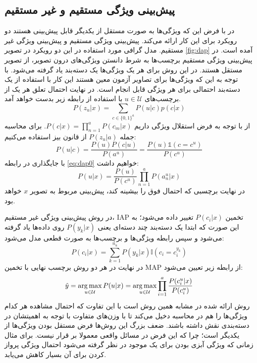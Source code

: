 \subsection{پیش‌بینی ویژگی مستقیم و غیر مستقیم}
در
\cite{lampert09}
با فرض این که ویژگی‌ها به صورت مستقل از یکدیگر قابل پیش‌بینی هستند دو رویکرد برای این کار ارائه می‌کند. پیش‌بینی ویژگی مستقیم
و پیش‌بینی ویژگی غیر مستقیم.
 مدل گرافی مورد استفاده در این دو رویکرد در تصویر \ref{fig:dap} آمده است. در پیش‌بینی ویژگی مستقیم برچسب‌ها به شرط دانستن ویژگی‌های درون تصویر، از تصویر مستقل هستند. در این روش برای هر یک ویژگی‌ها یک دسته‌بند یاد گرفته می‌شود. با توجه به این که ویژگی‌ها برای تصاویر آزمون معین هستند این کار با استفاده از یک دسته‌بند احتمالی برای هر ویژگی قابل انجام است. در نهایت احتمال تعلق هر یک از برچسب‌های
$ u \in \mathcal{U} $
با استفاده از رابطه زیر بدست خواهد آمد.
\begin{equation} \label{eq:dap0}
  P(z_u | x ) = \sum_{c\in \{0,1\}^a} P(u | c) p(c|x)
\end{equation}
از با توجه به فرض استقلال ویژگی داریم
$P(c|x) = \prod_{n=1}^a P(c_m |x)$.
برای محاسبه جمله $P(z_u | a)$ از قانون بیز استفاده می‌کنیم:
\[
P(u | c) = \frac{P(u)P(c|u)}{P(a^{u})}  = \frac {P(u) \mathds{1}(c= c^{u})} {P(c^{u})}
\]
با جایگذاری در رابطه \eqref{eq:dap0} خواهیم داشت:
\begin{equation}
  P(u | x ) = \frac{P(u)}{P(c^{u})} \prod_{n=1}^a P(a^{u}_n|x)
\end{equation}
در نهایت برچسبی که احتمال فوق را بیشینه کند، پیش‌بینی مربوط به تصویر $x$ خواهد بود.

در روش پیش‌بینی ویژگی غیر مستقیم، IAP
 تخمین  $P(c_i|x) $ تغییر داده می‌شود؛ به این صورت که ابتدا یک دسته‌بند چند دسته‌ای یعنی $P(y_k |x)$ روی داده‌ها یاد گرفته می‌شود و سپس رابطه ویژگی‌ها و برچسب‌ها به صورت قطعی مدل می‌شود:
\begin{equation}
P(c_i | x) = \sum_{k=1}^{n_u} P(y_k | x) \mathbb{I}(c_i = c^{y_k}_i)
\end{equation}
در نهایت در هر دو روش برچسب نهایی با تخمین MAP
از رابطه زیر تعیین می‌شود:
\begin{equation}
\hat{y} = \operatorname*{arg\,max}_{u \in \mathcal{U}} P(u|x) =  \operatorname*{arg\,max}_{u \in \mathcal{U}} \prod_{i=1}^a \frac{P(c_i^u | x)}{P(c_i^u)}
\end{equation}
روش ارائه شده در
\cite{suzuki14}
مشابه همین روش است با این تفاوت که احتمال مشاهده هر کدام ویژگی‌ها را هم در محاسبه دخیل می‌کند تا با وزن‌های متفاوت با توجه به اهمیتشان در دسته‌بندی نقش داشته باشند. ضعف بزرگ این روش‌ها فرض مستقل بودن ویژگی‌ها از یکدیگر است؛ چرا که این فرض در مسائل واقعی معمولا بر قرار نیست. برای مثال زمانی که ویژگی آبزی بودن برای یک موجود در نظر گرفته می‌شود احتمال ویژگی پرواز کردن برای آن بسیار کاهش می‌یابد.
